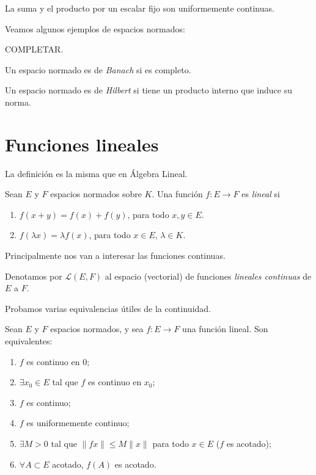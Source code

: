 \begin{remark}
	La suma y el producto por un escalar fijo son uniformemente continuas.
\end{remark}

Veamos algunos ejemplos de espacios normados:

\begin{example}
	\color{red} COMPLETAR.
\end{example}

\begin{definition}
	Un espacio normado es de \emph{Banach} si es completo.
\end{definition}

\begin{definition}
	Un espacio normado es de \emph{Hilbert} si tiene un producto interno que induce su norma.
\end{definition}


\section{Funciones lineales}

La definición es la misma que en Álgebra Lineal.

\begin{definition}
	Sean $E$ y $F$ espacios normados sobre $K$. Una función $f : E \to F$ es \emph{lineal} si
	\begin{enumerate}
		\item $f(x + y) = f(x) + f(y)$, para todo $x, y \in E$.
		\item $f(\lambda x) = \lambda f(x)$, para todo $x \in E$, $\lambda \in K$.
	\end{enumerate}
\end{definition}

Principalmente nos van a interesar las funciones continuas.

\begin{definition}
	Denotamos por $\mathcal{L}(E, F)$ al espacio (vectorial) de funciones \emph{lineales continuas} de $E$ a $F$.
\end{definition}

Probamos varias equivalencias útiles de la continuidad.

\begin{proposition}
	Sean $E$ y $F$ espacios normados, y sea $f : E \to F$ una función lineal. Son equivalentes:
	\begin{enumerate}
		\item $f$ es continuo en $0$;
		\item $\exists x_0 \in E$ tal que $f$ es continuo en $x_0$;
		\item $f$ es continuo;
		\item $f$ es uniformemente continuo;
		\item $\exists M > 0$ tal que $\|fx\| \le M\|x\|$ para todo $x \in E$ ($f$ es acotado);
		\item $\forall A \subset E$ acotado, $f(A)$ es acotado.
	\end{enumerate}
\end{proposition}

